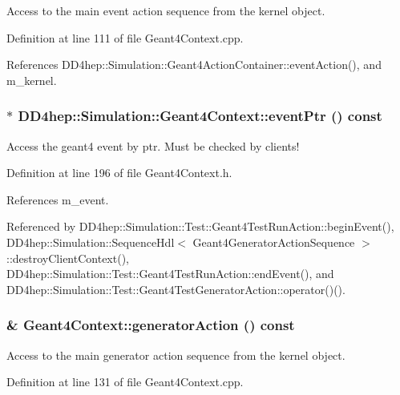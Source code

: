 Access to the main event action sequence from the kernel object. 

Definition at line 111 of file Geant4Context.cpp.

References DD4hep::Simulation::Geant4ActionContainer::eventAction(), and m\_\-kernel.\hypertarget{class_d_d4hep_1_1_simulation_1_1_geant4_context_ac87c91b95aa074da6cfcd34c237414d7}{
\subsubsection[{eventPtr}]{$\ast$ DD4hep::Simulation::Geant4Context::eventPtr () const}}
\label{class_d_d4hep_1_1_simulation_1_1_geant4_context_ac87c91b95aa074da6cfcd34c237414d7}


Access the geant4 event by ptr. Must be checked by clients! 

Definition at line 196 of file Geant4Context.h.

References m\_\-event.

Referenced by DD4hep::Simulation::Test::Geant4TestRunAction::beginEvent(), DD4hep::Simulation::SequenceHdl$<$ Geant4GeneratorActionSequence $>$::destroyClientContext(), DD4hep::Simulation::Test::Geant4TestRunAction::endEvent(), and DD4hep::Simulation::Test::Geant4TestGeneratorAction::operator()().\hypertarget{class_d_d4hep_1_1_simulation_1_1_geant4_context_a3bdbd4b579206f42311dec78bae10aab}{
\subsubsection[{generatorAction}]{ \& Geant4Context::generatorAction () const}}
\label{class_d_d4hep_1_1_simulation_1_1_geant4_context_a3bdbd4b579206f42311dec78bae10aab}


Access to the main generator action sequence from the kernel object. 

Definition at line 131 of file Geant4Context.cpp.

